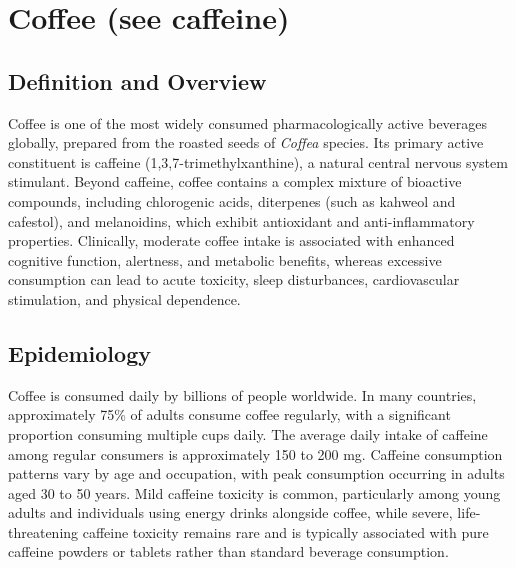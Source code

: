 \chapter{Coffee (see caffeine)}

\section*{Definition and Overview}
Coffee is one of the most widely consumed pharmacologically active beverages globally, prepared from the roasted seeds of \textit{Coffea} species. Its primary active constituent is caffeine (1,3,7-trimethylxanthine), a natural central nervous system stimulant. Beyond caffeine, coffee contains a complex mixture of bioactive compounds, including chlorogenic acids, diterpenes (such as kahweol and cafestol), and melanoidins, which exhibit antioxidant and anti-inflammatory properties. Clinically, moderate coffee intake is associated with enhanced cognitive function, alertness, and metabolic benefits, whereas excessive consumption can lead to acute toxicity, sleep disturbances, cardiovascular stimulation, and physical dependence.

\section*{Epidemiology}
Coffee is consumed daily by billions of people worldwide. In many countries, approximately 75\% of adults consume coffee regularly, with a significant proportion consuming multiple cups daily. The average daily intake of caffeine among regular consumers is approximately 150 to 200 mg. Caffeine consumption patterns vary by age and occupation, with peak consumption occurring in adults aged 30 to 50 years. Mild caffeine toxicity is common, particularly among young adults and individuals using energy drinks alongside coffee, while severe, life-threatening caffeine toxicity remains rare and is typically associated with pure caffeine powders or tablets rather than standard beverage consumption.


